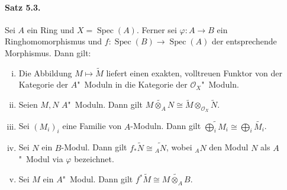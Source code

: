 \documentclass[11pt,b5paper,openany]{memoir}
\begin{document}
\paragraph{Satz 5.3.}\label{5.3} Sei $A$ ein Ring und $X=\operatorname{Spec}(A)$. Ferner sei $\varphi:A\to B$ ein Ringhomomorphismus und $f:\operatorname{Spec}(B)\to \operatorname{Spec}(A)$ der entsprechende Morphismus. Dann gilt:
\begin{enumerate}[(i)]
\item Die Abbildung $M\mapsto\widetilde{M}$ liefert einen exakten, volltreuen Funktor von der Kategorie der $A$"~Moduln in die Kategorie der $\mathcal{O}_X$"~Moduln.
\item Seien $M,N$ $A$"~Moduln. Dann gilt $\widetilde{M\otimes_AN}\cong \widetilde{M}\otimes_{\mathcal{O}_X}\widetilde{N}$.
\item Sei $(M_i)_i$ eine Familie von $A$-Moduln. Dann gilt $\widetilde{\bigoplus_i M_i}\cong\bigoplus_i\widetilde{M_i}$.
\item Sei $N$ ein $B$-Modul. Dann gilt $f_\ast\widetilde{N}\cong \widetilde{_AN}$, wobei $_AN$ den Modul $N$ als $A$"~Modul via $\varphi$ bezeichnet.
\item Sei $M$ ein $A$"~Modul. Dann gilt $f^\ast\widetilde{M}\cong \widetilde{M\otimes_A B}$.
\end{enumerate}
\end{document}
